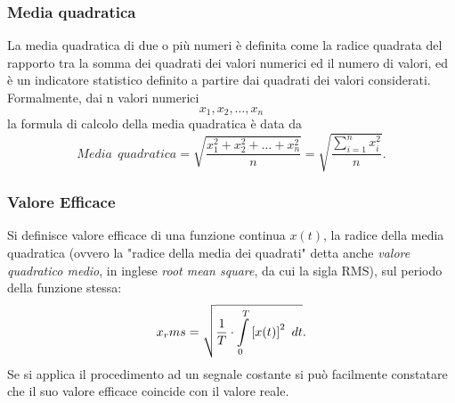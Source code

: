 \documentclass[12pt,oneside,openany]{memoir}
\numberwithin{equation}{subsection}
\newcommand{\dt}{\ dt}
\begin{document}

\subsubsection{Media quadratica}
La media quadratica di due o pi\`u numeri \`e definita come la radice quadrata
del rapporto tra la somma dei quadrati dei valori numerici ed il numero di
valori, ed \`e un indicatore statistico definito a partire dai quadrati dei
valori considerati.
Formalmente, dai n valori numerici
\begin{equation}
	x_1, x_2, \dots , x_n
\end{equation}
la formula di calcolo della media quadratica \`e data da
\begin{equation}
	Media \ \ quadratica = \sqrt{\frac{x_1^2 + x_2^2 + \dots + x_n^2}{n}} =
	\sqrt{\frac{\sum_{i = 1}^{n} x_i^2}{n}}.
\end{equation}


\subsubsection{Valore Efficace}
Si definisce valore efficace di una funzione continua $x(t)$, la radice della
media quadratica (ovvero la "radice della media dei quadrati" detta anche
\textit{valore quadratico medio}, in inglese \textit{root mean square}, da cui
la sigla RMS), sul periodo della funzione stessa: 
\begin{equation}
	x_rms = \sqrt{\frac{1}{T} \cdot \int\displaylimits_{0}^{T}
	\left[x(t)\right]^2 \dt}.
\end{equation}
Se si applica il procedimento ad un segnale costante si può facilmente
constatare che il suo valore efficace coincide con il valore reale. 


\newpage
\end{document}
